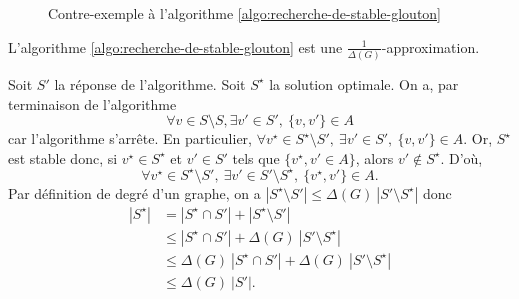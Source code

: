 \begin{figure}[H]
	\centering
	\begin{comment}
		0-1
		| |
		2-3-4
		  | |
			5-6-7
			  | |
				8-9
	\end{comment}
	\caption{Contre-exemple à l'algorithme \ref{algo:recherche-de-stable-glouton}}
\end{figure}

\begin{prop}
	L'algorithme \ref{algo:recherche-de-stable-glouton} est une $\frac{1}{\Delta(G)}$-approximation.
\end{prop}

\begin{prv}
	Soit $S'$\/ la réponse de l'algorithme.
	Soit $S^\star$\/ la solution optimale.
	On a, par terminaison de l'algorithme \[
		\forall v \in S \setminus S, \exists v' \in S',\: \{v,v'\} \in A
	\] car l'algorithme s'arrête. En particulier, $\forall v^\star \in S^\star \setminus S',\:\exists v' \in S',\: \{v, v'\} \in A$.
	Or, $S^\star$\/ est stable donc, si $v^\star\in S^\star$ et $v' \in S'$ tels que $\{v^\star, v' \in A\}$, alors $v' \not\in S^\star$. D'où, \[
		\forall v^\star \in S^\star \setminus S',\: \exists v' \in S' \setminus S^\star,\: \{v^\star, v'\} \in A
	.\]
	Par définition de degré d'un graphe, on a $|S^\star \setminus S'| \le \Delta(G) \:|S' \setminus S^\star|$\/ donc
	\begin{align*}
		|S^\star| &= |S^\star \cap S'| + |S^\star \setminus S'| \\
		&\le  |S^\star \cap S'| + \Delta(G)\:|S' \setminus S^\star|\\
		&\le \Delta(G)\:|S^\star  \cap S'| + \Delta(G)\:|S' \setminus S^\star|\\
		&\le \Delta(G) \:|S'|.
	\end{align*}
\end{prv}
